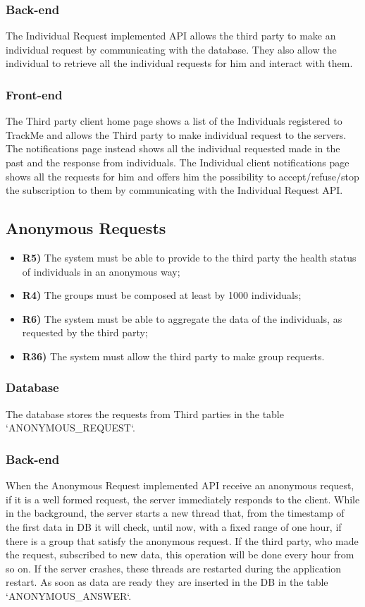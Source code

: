 \subsubsection*{Back-end}
The Individual Request implemented API allows the third party to make an individual request by communicating with the database. They also allow the individual to retrieve all the individual requests for him and interact with them.

\subsubsection*{Front-end}
The Third party client home page shows a list of the Individuals registered to TrackMe and allows the Third party to make individual request to the servers. The notifications page instead shows all the individual requested made in the past and the response from individuals.
The Individual client notifications page shows all the requests for him and offers him the possibility to accept/refuse/stop the subscription to them by communicating with the Individual Request API.

\subsection{Anonymous Requests}	
\begin{itemize}
	\item {\color{Green}\textbf{R5)}} The system must be able to provide to the third party the health status of individuals
in an anonymous way;
	\item {\color{Green}\textbf{R4)}} The groups must be composed at least by 1000 individuals;
	\item {\color{Green}\textbf{R6)}} The system must be able to aggregate the data of the individuals, as requested by the
third party;
	\item {\color{Green}\textbf{R36)}} The system must allow the third party to make group requests.\\
\end{itemize}
\subsubsection*{Database}
The database stores the requests from Third parties in the table `ANONYMOUS\_REQUEST`.


\subsubsection*{Back-end}
When the Anonymous Request implemented API receive an anonymous request, if it is a well formed request, the server immediately responds to the client. While in the background, the server starts a new thread that, from the timestamp of the first data in DB it will check, until now, with a fixed range of one hour, if there is a group that satisfy the anonymous request.
If the third party, who made the request, subscribed to new data, this operation will be done every hour from so on. If the server crashes, these threads are restarted during the application restart. As soon as data are ready they are inserted in the DB in the table `ANONYMOUS\_ANSWER`.


